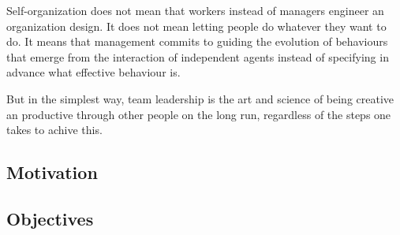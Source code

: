 \begin{displayquote}
Self-organization does not mean that workers instead of managers engineer an organization design. It does not mean letting people do whatever they want to do. It means that management commits to guiding the evolution of behaviours that emerge from the interaction of independent agents instead of specifying in advance what effective behaviour is.
\end{displayquote}

But in the simplest way, team leadership is the art and science of being creative an productive through other people on the long run, regardless of the steps one takes to achive this.


\subsection{Motivation}
\label{sub-sec:motivation}

\subsection{Objectives}
\label{sub-sec:objectives}



